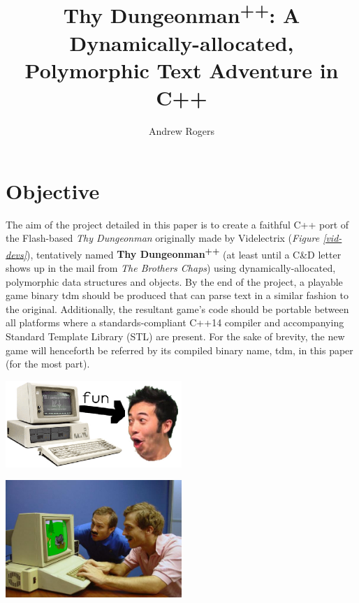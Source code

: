 \documentclass[man,12pt]{apa6}
\title{Thy Dungeonman\textsuperscript{++}: A Dynamically-allocated, Polymorphic
       Text Adventure in C++}
\author{Andrew Rogers}
\affiliation{Crazy Go Nuts University}
\begin{document}
\maketitle

\section{Objective}
The aim of the project detailed in this paper is to create a faithful C++ port
of the Flash-based \emph{Thy Dungeonman} originally made by Videlectrix
(\emph{Figure \ref{vid-devs}}), tentatively named \textbf{Thy
Dungeonman\textsuperscript{++}} (at least until a C\&D letter shows up in the
mail from \emph{The Brothers Chaps}) using dynamically-allocated, polymorphic
data structures and objects.  By the end of the project, a playable game binary
\textsf{tdm} should be produced that can parse text in a similar fashion to the
original.  Additionally, the resultant game's code should be portable between
all platforms where a standards-compliant C++14 compiler and accompanying
Standard Template Library (STL) are present.
For the sake of brevity, the new game will henceforth be referred by its
compiled binary name, \textsf{tdm}, in this paper (for the most part).

\begin{center}
  \centering
    \includegraphics[width=0.5\textwidth]{use-case-dia}
  \captionsetup{justification=centering}
  \label{vid-devs}
\end{center}

\begin{center}
  \centering
    \includegraphics[width=0.5\textwidth]{Videlectrix_developers}
  \captionsetup{justification=centering}
  \label{vid-devs}
\end{center}
\end{document}
